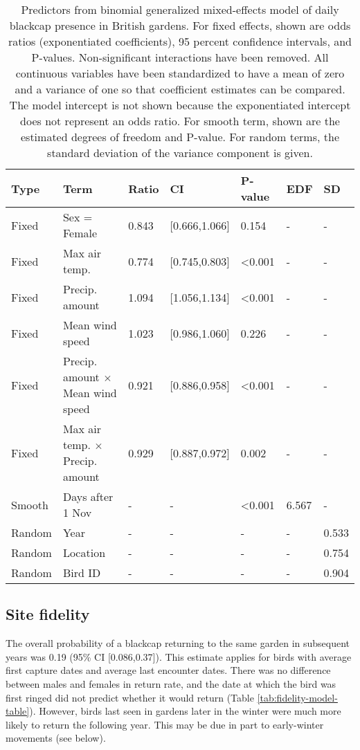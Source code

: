 \documentclass[a4paper, nobind]{templates/ociamthesis}
\begin{document}
\begin{table}[t]

\caption{\label{tab:indiv-model-table}Predictors from binomial generalized mixed-effects model of daily blackcap presence in British gardens. For fixed effects, shown are odds ratios (exponentiated coefficients), 95 percent confidence intervals, and P-values. Non-significant interactions have been removed. All continuous variables have been standardized to have a mean of zero and a variance of one so that coefficient estimates can be compared. The model intercept is not shown because the exponentiated intercept does not represent an odds ratio. For smooth term, shown are the estimated degrees of freedom and P-value. For random terms, the standard deviation of the variance component is given.}
\centering
\fontsize{9.5}{11.5}\selectfont
\begin{tabular}{l|>{\raggedright\arraybackslash}p{9em}|l|l|l|l|l}
\hline
Type & Term & Ratio & CI & P-value & EDF & SD\\
\hline
Fixed & Sex = Female & 0.843 & [0.666,1.066] & 0.154 & - & -\\
\hline
Fixed & Max air temp. & 0.774 & [0.745,0.803] & <0.001 & - & -\\
\hline
Fixed & Precip. amount & 1.094 & [1.056,1.134] & <0.001 & - & -\\
\hline
Fixed & Mean wind speed & 1.023 & [0.986,1.060] & 0.226 & - & -\\
\hline
Fixed & Precip. amount $\times$ Mean wind speed & 0.921 & [0.886,0.958] & <0.001 & - & -\\
\hline
Fixed & Max air temp. $\times$ Precip. amount & 0.929 & [0.887,0.972] & 0.002 & - & -\\
\hline
Smooth & Days after 1 Nov & - & - & <0.001 & 6.567 & -\\
\hline
Random & Year & - & - & - & - & 0.533\\
\hline
Random & Location & - & - & - & - & 0.754\\
\hline
Random & Bird ID & - & - & - & - & 0.904\\
\hline
\end{tabular}
\end{table}

\hypertarget{site-fidelity-1}{%
\subsection{Site fidelity}\label{site-fidelity-1}}

The overall probability of a blackcap returning to the same garden in subsequent years was 0.19 (95\% CI {[}0.086,0.37{]}). This estimate applies for birds with average first capture dates and average last encounter dates. There was no difference between males and females in return rate, and the date at which the bird was first ringed did not predict whether it would return (Table \ref{tab:fidelity-model-table}). However, birds last seen in gardens later in the winter were much more likely to return the following year. This may be due in part to early-winter movements (see below).
\end{document}

